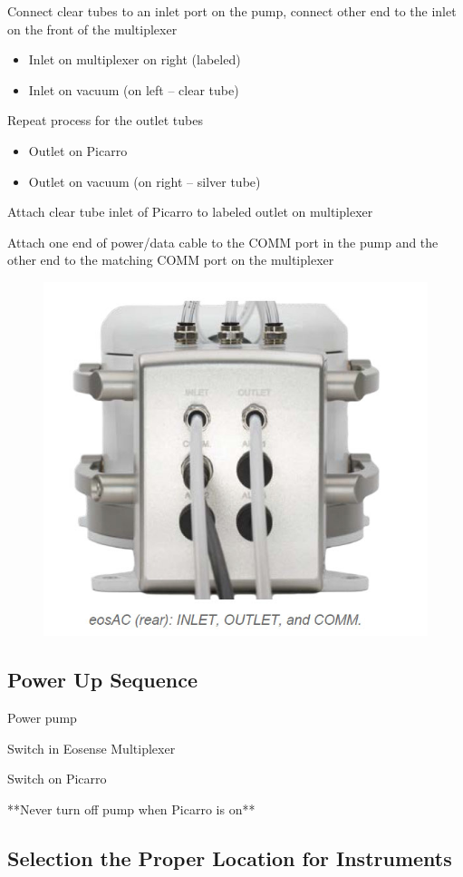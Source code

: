 \documentclass[12pt]{../SOP3}\usepackage[]{graphicx}\usepackage[]{color}
\begin{document}
\NP Connect clear tubes to an inlet port on the pump, connect other end to the inlet on the front of the multiplexer

\begin{itemize}
  \item Inlet on multiplexer on right (labeled)
  \item Inlet on vacuum (on left -- clear tube)
\end{itemize}



\NP Repeat process for the outlet tubes
\begin{itemize}
  \item Outlet on Picarro
  \item Outlet on vacuum (on right -- silver tube)
\end{itemize}

\NP Attach clear tube inlet of Picarro to labeled outlet on multiplexer

\NP Attach one end of power/data cable to the COMM port in the pump and the other end to the matching COMM port on the multiplexer

\begin{figure}
  \includegraphics[width=.5\textwidth]{"graphics/COMM"}
\end{figure}

\subsection{Power Up Sequence}

\NP Power pump

\NP Switch in Eosense Multiplexer

\NP Switch on Picarro 

**Never turn off pump when Picarro is on**

\subsection*{Selection the Proper Location for Instruments}
\end{document}
